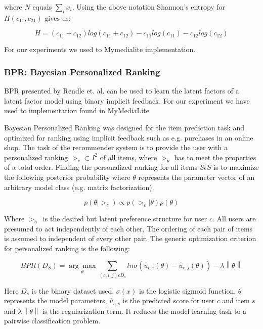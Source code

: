 where $N$ equals $\sum_i x_i$. Using the above notation Shannon's entropy for $H(c_{11}, c_{21})$ gives us:

\begin{equation}
H = (c_{11} + c_{12})log(c_{11} + c_{12})-c_{11} log(c_{11}) - c_{12} log(c_{12})
\end{equation}

For our experiments we used to Mymedialite \cite{Ganter2011MyMediaLite} implementation. 

\subsubsection{BPR: Bayesian Personalized Ranking}

BPR presented by Rendle et. al. \cite{Rendle2009} can be used to learn the latent factors of a
latent factor model using binary implicit feedback. For our experiment we have used to implementation
found in MyMediaLite \cite{Gantner2011MyMediaLite}

Bayesian Personalized Ranking was designed for the item prediction task and optimized for ranking using implicit
feedback such as e.g. purchases in an online shop. The task of the recommender system is to provide the
user with a personalized ranking $>_c \subset I^2$ of all items, where $>_u$ has to meet the properties of a total order.
Finding the personalized ranking for all items $S \epsilon S$ is to maximize the following posterior probability
where $\theta$ represents the parameter vector of an arbitrary model class (e.g. matrix factorization).

\begin{equation}
p(\theta | >_c) \propto p(>_c | \theta) p(\theta)
\end{equation}

Where $>_u$ is the desired but latent preference structure for user $c$. All users are presumed to act
independently of each other. The ordering of each pair of items is assumed to independent of every other pair.
The generic optimization criterion for personalized ranking is the following:

\begin{equation}
BPR(D_S) = \underset{\theta}{\arg\max} \sum_{(c,i,j)\epsilon D_s} ln \sigma(\hat{u}_{c,i}(\theta)-\hat{u}_{c,j}(\theta)) - \lambda \left\|\theta \right\|
\end{equation}

Here $D_s$ is the binary dataset used, $\sigma(x)$ is the logistic sigmoid function, $\theta$ represents
the model parameters, $\hat{u}_{c,s}$ is the predicted score for user $c$ and item $s$ and 
$\lambda \left\|\theta \right\|$ is the regularization term. It reduces the model learning task to
a pairwise classification problem.\newline

